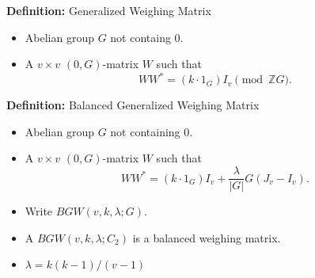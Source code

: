 \documentclass{beamer}
\newcommand{\abs}[1]{|#1|}
\begin{document}
\begin{frame}

  \begin{block}{{\bf Definition:} Generalized Weighing Matrix}
    \begin{itemize}
    \item Abelian group $G$ not containg $0$.
    \item A $v \times v$ $(0,G)$-matrix $W$ such that
      \[
        WW^* = (k \cdot 1_G)I_v \pmod{\mathbb{Z}G}.
      \]
    \end{itemize}
  \end{block}

  \begin{block}{{\bf Definition:} Balanced Generalized Weighing Matrix}
    \begin{itemize}
    \item Abelian group $G$ not containing $0$.
    \item A $v \times v$ $(0,G)$-matrix $W$ such that
      \[
        WW^* = (k \cdot 1_G)I_v + \frac{\lambda}{\abs{G}}G(J_v-I_v).
      \]
    \item Write $BGW(v,k,\lambda; G)$.
    \end{itemize}
  \end{block}

  \begin{itemize}
  \item A $BGW(v,k,\lambda;C_2)$ is a balanced weighing matrix. 
  \item $\lambda = k(k-1)/(v-1)$
  \end{itemize}
  
\end{frame}
\end{document}

